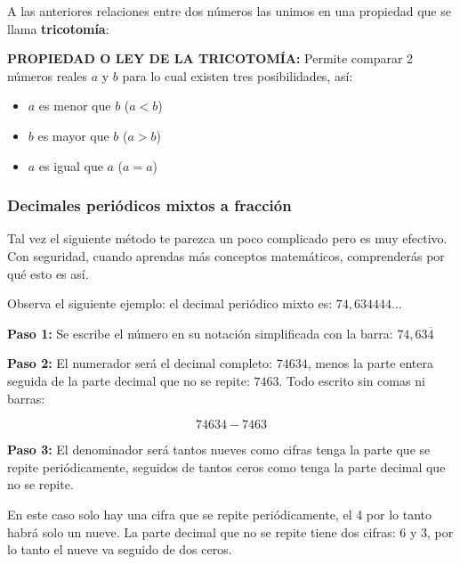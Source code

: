\documentclass[12pt,a4paper]{article}
\begin{document}
\vspace{0.5cm}

A las anteriores relaciones entre dos números las unimos en una propiedad que se llama \textbf{tricotomía}:

\begin{tcolorbox}[colback=fondoazul,colframe=azuloscuro,breakable]
\textbf{PROPIEDAD O LEY DE LA TRICOTOMÍA:} Permite comparar 2 números reales $a$ y $b$ para lo cual existen tres posibilidades, así:

\begin{itemize}
\item $a$ es menor que $b$ ($a < b$)
\item $b$ es mayor que $b$ ($a> b$)
\item $a$ es igual que $a$ ($a=a$)
\end{itemize}
\end{tcolorbox}

\vspace{1cm}

\subsubsection*{Decimales periódicos mixtos a fracción}

Tal vez el siguiente método te parezca un poco complicado pero es muy efectivo. Con seguridad, cuando aprendas más conceptos matemáticos, comprenderás por qué esto es así.

Observa el siguiente ejemplo: el decimal periódico mixto es: $74,634444...$

\textbf{Paso 1:} Se escribe el número en su notación simplificada con la barra: $74,63\overline{4}$

\textbf{Paso 2:} El numerador será el decimal completo: $74634$, menos la parte entera seguida de la parte decimal que no se repite: $7463$. Todo escrito sin comas ni barras:

$$74634 - 7463$$

\textbf{Paso 3:} El denominador será tantos nueves como cifras tenga la parte que se repite periódicamente, seguidos de tantos ceros como tenga la parte decimal que no se repite.

En este caso solo hay una cifra que se repite periódicamente, el 4 por lo tanto habrá solo un nueve. La parte decimal que no se repite tiene dos cifras: 6 y 3, por lo tanto el nueve va seguido de dos ceros.

\end{document}
